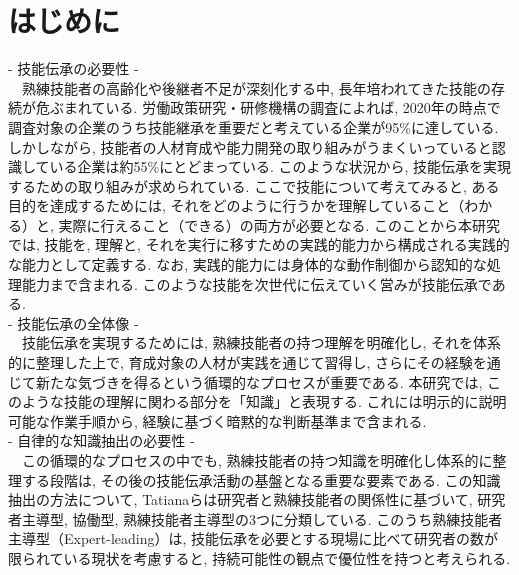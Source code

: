 \chapter{はじめに}
- 技能伝承の必要性 -\\
　熟練技能者の高齢化や後継者不足が深刻化する中, 長年培われてきた技能の存続が危ぶまれている. 労働政策研究・研修機構の調査によれば, 2020年の時点で調査対象の企業のうち技能継承を重要だと考えている企業が95\%に達している. しかしながら, 技能者の人材育成や能力開発の取り組みがうまくいっていると認識している企業は約55\%にとどまっている\cite{JILPT2020}. このような状況から, 技能伝承を実現するための取り組みが求められている. ここで技能について考えてみると, ある目的を達成するためには, それをどのように行うかを理解していること（わかる）と, 実際に行えること（できる）の両方が必要となる. このことから本研究では, 技能を, 理解と, それを実行に移すための実践的能力から構成される実践的な能力として定義する. なお, 実践的能力には身体的な動作制御から認知的な処理能力まで含まれる. このような技能を次世代に伝えていく営みが技能伝承である.\\

- 技能伝承の全体像 -\\
　技能伝承を実現するためには, 熟練技能者の持つ理解を明確化し, それを体系的に整理した上で, 育成対象の人材が実践を通じて習得し, さらにその経験を通じて新たな気づきを得るという循環的なプロセスが重要である. 本研究では, このような技能の理解に関わる部分を「知識」と表現する. これには明示的に説明可能な作業手順から, 経験に基づく暗黙的な判断基準まで含まれる.\\

- 自律的な知識抽出の必要性 -\\
　この循環的なプロセスの中でも, 熟練技能者の持つ知識を明確化し体系的に整理する段階は, その後の技能伝承活動の基盤となる重要な要素である. この知識抽出の方法について, Tatianaらは研究者と熟練技能者の関係性に基づいて, 研究者主導型, 協働型, 熟練技能者主導型の3つに分類している\cite{Tatiana2012}. このうち熟練技能者主導型（Expert-leading）は, 技能伝承を必要とする現場に比べて研究者の数が限られている現状を考慮すると, 持続可能性の観点で優位性を持つと考えられる.\\

